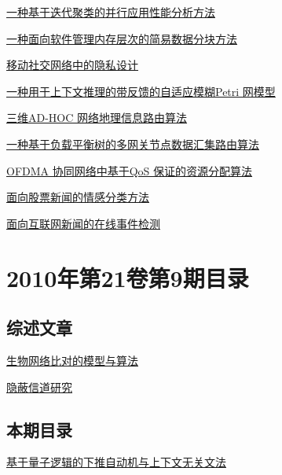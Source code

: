 \documentclass[a4paper]{article}
\begin{document}
\href{http://www.jos.org.cn/ch/reader/download_pdf.aspx?file_no=10029&year_id=2010&quarter_id=zk&falg=1}{一种基于迭代聚类的并行应用性能分析方法}

\href{http://www.jos.org.cn/ch/reader/download_pdf.aspx?file_no=10030&year_id=2010&quarter_id=zk&falg=1}{一种面向软件管理内存层次的简易数据分块方法}

\href{http://www.jos.org.cn/ch/reader/download_pdf.aspx?file_no=10031&year_id=2010&quarter_id=zk&falg=1}{移动社交网络中的隐私设计}

\href{http://www.jos.org.cn/ch/reader/download_pdf.aspx?file_no=10032&year_id=2010&quarter_id=zk&falg=1}{一种用于上下文推理的带反馈的自适应模糊Petri 网模型}

\href{http://www.jos.org.cn/ch/reader/download_pdf.aspx?file_no=10033&year_id=2010&quarter_id=zk&falg=1}{三维AD-HOC 网络地理信息路由算法}

\href{http://www.jos.org.cn/ch/reader/download_pdf.aspx?file_no=10034&year_id=2010&quarter_id=zk&falg=1}{一种基于负载平衡树的多网关节点数据汇集路由算法}

\href{http://www.jos.org.cn/ch/reader/download_pdf.aspx?file_no=10035&year_id=2010&quarter_id=zk&falg=1}{OFDMA 协同网络中基于QoS 保证的资源分配算法}

\href{http://www.jos.org.cn/ch/reader/download_pdf.aspx?file_no=10036&year_id=2010&quarter_id=zk&falg=1}{面向股票新闻的情感分类方法}

\href{http://www.jos.org.cn/ch/reader/download_pdf.aspx?file_no=10037&year_id=2010&quarter_id=zk&falg=1}{面向互联网新闻的在线事件检测}


\section{\textbf{2010年第21卷第9期目录}}
\subsection{综述文章}
\href{http://www.jos.org.cn/ch/reader/download_pdf.aspx?file_no=3860&year_id=2010&quarter_id=9&falg=1}{生物网络比对的模型与算法}

\href{http://www.jos.org.cn/ch/reader/download_pdf.aspx?file_no=3880&year_id=2010&quarter_id=9&falg=1}{隐蔽信道研究}

\subsection{本期目录}
\href{http://www.jos.org.cn/ch/reader/download_pdf.aspx?file_no=3855&year_id=2010&quarter_id=9&falg=1}{基于量子逻辑的下推自动机与上下文无关文法}
\end{document}
